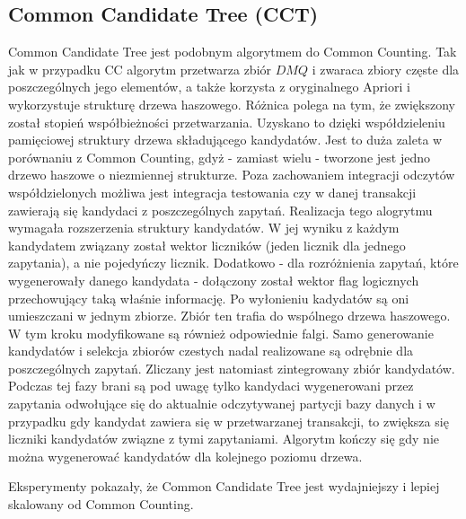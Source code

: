 \subsection{Common Candidate Tree (CCT) \cite{WojciechowskiCCT}}
\label{c326}
Common Candidate Tree jest podobnym algorytmem do Common Counting. Tak jak w przypadku CC algorytm przetwarza zbiór \(DMQ\) i zwaraca zbiory częste dla poszczególnych jego elementów, a także korzysta z oryginalnego Apriori i wykorzystuje strukturę drzewa haszowego. Różnica polega na tym, że zwiększony został stopień współbieżności przetwarzania. Uzyskano to dzięki współdzieleniu pamięciowej struktury drzewa składującego kandydatów. Jest to duża zaleta w porównaniu z Common Counting, gdyż - zamiast wielu - tworzone jest jedno drzewo haszowe o niezmiennej strukturze. Poza zachowaniem integracji odczytów współdzielonych możliwa jest integracja testowania czy w danej transakcji zawierają się kandydaci z poszczególnych zapytań. Realizacja tego alogrytmu wymagała rozszerzenia struktury kandydatów. W jej wyniku z każdym kandydatem związany został wektor liczników (jeden licznik dla jednego zapytania), a nie pojedyńczy licznik. Dodatkowo - dla rozróżnienia zapytań, które wygenerowały danego kandydata - dołączony został wektor flag logicznych przechowujący taką właśnie informację. Po wyłonieniu kadydatów są oni umieszczani w jednym zbiorze. Zbiór ten trafia do wspólnego drzewa haszowego. W tym kroku modyfikowane są również odpowiednie falgi. Samo generowanie kandydatów i selekcja zbiorów czestych nadal realizowane są odrębnie dla poszczególnych zapytań. Zliczany jest natomiast zintegrowany zbiór kandydatów. Podczas tej fazy brani są pod uwagę tylko kandydaci wygenerowani przez zapytania odwołujące się do aktualnie odczytywanej partycji bazy danych i w przypadku gdy kandydat zawiera się w przetwarzanej transakcji, to zwiększa się liczniki kandydatów związne z tymi zapytaniami. Algorytm kończy się gdy nie można wygenerować kandydatów dla kolejnego poziomu drzewa. 

Eksperymenty \cite{WojciechowskiCCT} pokazały, że Common Candidate Tree jest wydajniejszy i lepiej skalowany od Common Counting.


